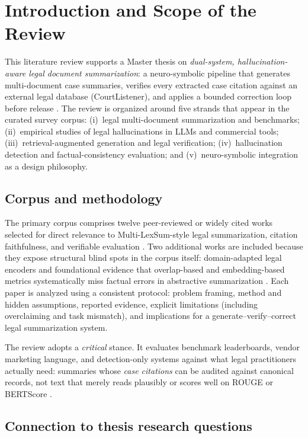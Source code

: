 \section{Introduction and Scope of the Review}

This literature review supports a Master thesis on \emph{dual-system, hallucination-aware legal document summarization}: a neuro-symbolic pipeline that generates multi-document case summaries, verifies every extracted case citation against an external legal database (CourtListener), and applies a bounded correction loop before release \cite{courtlistener_api}. The review is organized around five strands that appear in the curated survey corpus: (i)~legal multi-document summarization and benchmarks; (ii)~empirical studies of legal hallucinations in LLMs and commercial tools; (iii)~retrieval-augmented generation and legal verification; (iv)~hallucination detection and factual-consistency evaluation; and (v)~neuro-symbolic integration as a design philosophy.

\subsection{Corpus and methodology}

The primary corpus comprises twelve peer-reviewed or widely cited works selected for direct relevance to Multi-LexSum-style legal summarization, citation faithfulness, and verifiable evaluation \cite{shen2022multilexsum}. Two additional works are included because they expose structural blind spots in the corpus itself: domain-adapted legal encoders \cite{chalkidis2020legalbert} and foundational evidence that overlap-based and embedding-based metrics systematically miss factual errors in abstractive summarization \cite{maynez2020faithfulness,pagnoni2021factuality}. Each paper is analyzed using a consistent protocol: problem framing, method and hidden assumptions, reported evidence, explicit limitations (including overclaiming and task mismatch), and implications for a generate--verify--correct legal summarization system.

The review adopts a \emph{critical} stance. It evaluates benchmark leaderboards, vendor marketing language, and detection-only systems against what legal practitioners actually need: summaries whose \emph{case citations} can be audited against canonical records, not text that merely reads plausibly or scores well on ROUGE \cite{lin2004rouge} or BERTScore \cite{zhang2020bertscore}.

\subsection{Connection to thesis research questions}

